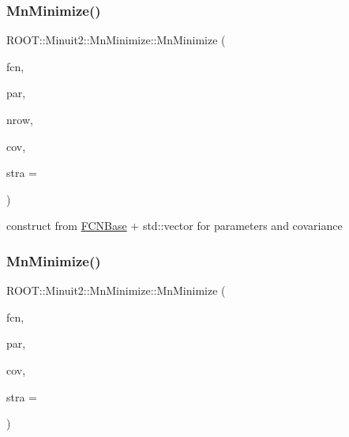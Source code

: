 \subsubsection{\texorpdfstring{MnMinimize()}{MnMinimize()}\hspace{0.1cm}{\footnotesize\ttfamily [15/26]}}
{\footnotesize\ttfamily R\+O\+O\+T\+::\+Minuit2\+::\+Mn\+Minimize\+::\+Mn\+Minimize (\begin{DoxyParamCaption}\item[{const \mbox{\hyperlink{classROOT_1_1Minuit2_1_1FCNBase}{F\+C\+N\+Base}} \&}]{fcn,  }\item[{const std\+::vector$<$ double $>$ \&}]{par,  }\item[{unsigned int}]{nrow,  }\item[{const std\+::vector$<$ double $>$ \&}]{cov,  }\item[{unsigned int}]{stra = {} }\end{DoxyParamCaption})\hspace{0.3cm}{\ttfamily [inline]}}



construct from \mbox{\hyperlink{classROOT_1_1Minuit2_1_1FCNBase}{F\+C\+N\+Base}} + std\+::vector for parameters and covariance 

\mbox{\label{classROOT_1_1Minuit2_1_1MnMinimize_a4cf2e37839cc454720ab3bd8041dffa9}} 
\subsubsection{\texorpdfstring{MnMinimize()}{MnMinimize()}\hspace{0.1cm}{\footnotesize\ttfamily [16/26]}}
{\footnotesize\ttfamily R\+O\+O\+T\+::\+Minuit2\+::\+Mn\+Minimize\+::\+Mn\+Minimize (\begin{DoxyParamCaption}\item[{const \mbox{\hyperlink{classROOT_1_1Minuit2_1_1FCNBase}{F\+C\+N\+Base}} \&}]{fcn,  }\item[{const std\+::vector$<$ double $>$ \&}]{par,  }\item[{const \mbox{\hyperlink{classROOT_1_1Minuit2_1_1MnUserCovariance}{Mn\+User\+Covariance}} \&}]{cov,  }\item[{unsigned int}]{stra = {} }\end{DoxyParamCaption})\hspace{0.3cm}{\ttfamily [inline]}}



